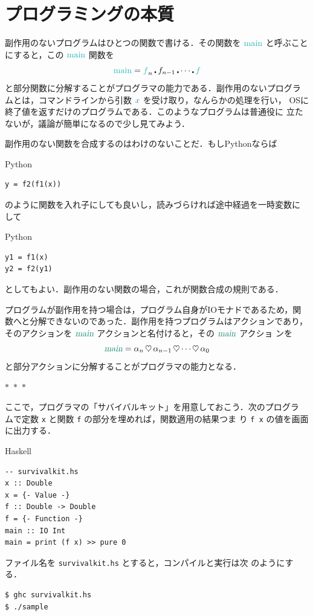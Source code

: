 \documentclass[a5paper,twoside,fleqn,draft]{jsbook}
\def\varColor{NavyBlue}
\def\funcColor{BlueGreen}
\def\actionColor{PineGreen}
\newcommand{\separator}{\begin{center}$*$~$*$~$*$\end{center}}
\newcommand{\programminglanguage}[1]{\textsf{#1}}
\newcommand{\haskell}{\programminglanguage{Haskell}}
\newcommand{\python}{\programminglanguage{Python}}
\newcommand{\code}[1]{\texttt{#1}}
\newcommand{\filename}[1]{\texttt{#1}}
\newenvironment{haskellcode}{\begin{itembox}[r]{\haskell}}{\end{itembox}}
\newenvironment{pythoncode}{\begin{itembox}[r]{\python}}{\end{itembox}}
\newcommand{\mVar}[1]{\textcolor{\varColor}{#1}}
\newcommand{\mXVar}{\mVar{x}}
\newcommand{\mFunc}[1]{\textcolor{\funcColor}{#1}}
\newcommand{\mSpecialFunc}[1]{\textcolor{\funcColor}{\textrm{#1}}}
\newcommand{\mFFunc}{{\mFunc{f}}}
\DeclareMathOperator{\mMainFunc}{\mSpecialFunc{main}}
\newcommand{\mActionLong}[1]{\textcolor{\actionColor}{\textsl{#1}}}
\DeclareMathOperator{\mMain}{\mActionLong{main}}
\DeclareMathOperator{\mBind}{\heartsuit}
\DeclareMathOperator{\mCompFunc}{\centerdot}
\begin{document}
\section{プログラミングの本質}

副作用のないプログラムはひとつの関数で書ける．その関数を $\mMainFunc$
と呼ぶことにすると，この $\mMainFunc$ 関数を
\begin{equation}
\mMainFunc=\mFFunc_n\mCompFunc f_{n-1}\mCompFunc\dotsb\mCompFunc \mFFunc
\end{equation}
と部分関数に分解することがプログラマの能力である．副作用のないプログラ
ムとは，コマンドラインから引数 $\mXVar$ を受け取り，なんらかの処理を行い，
OSに終了値を返すだけのプログラムである．このようなプログラムは普通役に
立たないが，議論が簡単になるので少し見てみよう．

副作用のない関数を合成するのはわけのないことだ．もし\python ならば
\begin{pythoncode}
\begin{verbatim}
y = f2(f1(x))
\end{verbatim}
\end{pythoncode}
のように関数を入れ子にしても良いし，読みづらければ途中経過を一時変数に
して
\begin{pythoncode}
\begin{verbatim}
y1 = f1(x)
y2 = f2(y1)
\end{verbatim}
\end{pythoncode}
としてもよい．副作用のない関数の場合，これが関数合成の規則である．

プログラムが副作用を持つ場合は，プログラム自身がIOモナドであるため，関
数へと分解できないのであった．副作用を持つプログラムはアクションであり，
そのアクションを $\mMain$ アクションと名付けると，その $\mMain$ アクショ
ンを
\begin{equation}
\mMain=\alpha_n\mBind\alpha_{n-1}\mBind\dotsb\mBind\alpha_0
\end{equation}
と部分アクションに分解することがプログラマの能力となる．


\separator

ここで，プログラマの「サバイバルキット」を用意しておこう．次のプログラ
ムで定数 \code{x} と関数 \code{f} の部分を埋めれば，関数適用の結果つま
り \code{f x} の値を画面に出力する．
\begin{haskellcode}
\begin{verbatim}
-- survivalkit.hs
x :: Double
x = {- Value -}
f :: Double -> Double
f = {- Function -}
main :: IO Int
main = print (f x) >> pure 0
\end{verbatim}
\end{haskellcode}
ファイル名を \filename{survivalkit.hs} とすると，コンパイルと実行は次
のようにする．
\begin{verbatim}
$ ghc survivalkit.hs
$ ./sample
\end{verbatim}%
\end{document}
